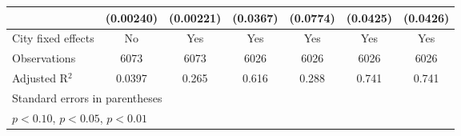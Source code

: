 {\begin{tabular}{l*{6}{c}}
                    &   (0.00240)         &   (0.00221)         &    (0.0367)         &    (0.0774)         &    (0.0425)         &    (0.0426)         \\
\midrule
City fixed effects  &          No         &         Yes         &         Yes         &         Yes         &         Yes         &         Yes         \\
Observations        &        6073         &        6073         &        6026         &        6026         &        6026         &        6026         \\
Adjusted R$^2$      &      0.0397         &       0.265         &       0.616         &       0.288         &       0.741         &       0.741         \\
\bottomrule
\multicolumn{7}{l}{\footnotesize Standard errors in parentheses}\\
\multicolumn{7}{l}{\footnotesize \sym{*} \(p<0.10\), \sym{**} \(p<0.05\), \sym{***} \(p<0.01\)}\\
\end{tabular}
}
